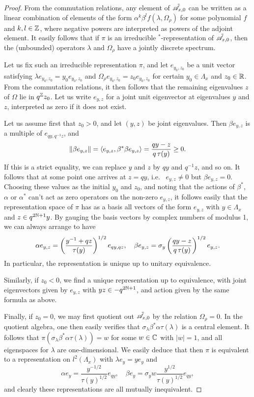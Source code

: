 \begin{proof} From the commutation relations, any element of $\tilde{\mathscr{A}}_{x,0}$ can be written as a linear combination of elements of the form $\alpha^k \beta^l f(\lambda,\Omega_{\rho})$ for some polynomial $f$ and $k,l\in \mathbb{Z}$, where negative powers are interpreted as powers of the adjoint element. It easily follows that if $\pi$ is an irreducible $^*$-representation of $\tilde{\mathscr{A}}_{x,0}$, then the (unbounded) operators $\lambda$ and $\Omega_{\rho}$ have a jointly discrete spectrum. 

Let us fix such an irreducible representation $\pi$, and let $e_{y_0,z_0}$ be a unit vector satisfying $\lambda e_{y_0,z_0} = y_0e_{y_0,z_0}$ and $\Omega_{\rho} e_{y_0,z_0} = z_0 e_{y_0,z_0}$ for certain $y_0 \in \Lambda_x$ and $z_0\in \mathbb{R}$. From the commutation relations, it then follows that the remaining eigenvalues $z$ of $\Omega$ lie in $q^{\mathbb{Z}}z_0$. Let us write $e_{y,z}$ for a joint unit eigenvector at eigenvalues $y$ and $z$, interpreted as zero if it does not exist. 

Let us assume first that $z_0>0$, and let $(y,z)$ be joint eigenvalues. Then $\beta e_{y,z}$ is a multiple of $e_{qy,q^{-1}z}$, and \[\|\beta e_{y,z}\| = \langle e_{y,z},\beta^* \beta e_{y,z}\rangle = \frac{qy-z}{q\operatorname{\tau}(y)} \geq 0.\]  If this is a strict equality, we can replace $y$ and $z$ by $qy$ and $q^{-1}z$, and so on. It follows that at some point one arrives at $z=qy$, i.e.~ $e_{y,z}\neq 0$ but $\beta e_{y,z}=0$. Choosing these values as the initial $y_0$ and $z_0$, and noting that the actions of $\beta^*$, $\alpha$ or $\alpha^*$ can't act as zero operators on the non-zero $e_{y,z}$, it follows easily that the representation space of $\pi$ has as a basis all vectors of the form $e_{y,z}$ with $y\in \Lambda_x$ and $z\in q^{2\mathbb{N}+1}y$. By gauging the basis vectors by complex numbers of modulus 1, we can always arrange to have \[\alpha e_{y,z} =  \left(\frac{y^{-1}+qz}{\operatorname{\tau}(y)}\right)^{1/2}e_{qy,qz}, \quad \beta e_{y,z} = \sigma_y \left(\frac{qy-z}{q\operatorname{\tau}(y)}\right)^{1/2}e_{y,z}.\] In particular, the representation is unique up to unitary equivalence.

Similarly, if $z_0<0$, we find a unique representation up to equivalence, with joint eigenvectors given by $e_{y,z}$ with $yz \in -q^{2\mathbb{N}+1}$, and action given by the same formula as above.

Finally, if $z_0=0$, we may first quotient out $\tilde{\mathscr{A}}_{x,0}$ by the relation $\Omega_{\rho}=0$. In the quotient algebra, one then easily verifies that $\sigma_{\lambda}\beta^*\alpha\tau(\lambda)$ is a central element. It follows that $\pi(\sigma_{\lambda}\beta^*\alpha\tau(\lambda)) = w$ for some $w \in \mathbb{C}$ with $|w|=1$, and all eigenspaces for $\lambda$ are one-dimensional. We easily deduce that then $\pi$ is equivalent to a representation on $l^2(\Lambda_x)$ with $\lambda e_y = ye_y$ and  
\[\alpha e_y = \frac{y^{-1/2}}{\tau(y)^{1/2}}e_{qy},\quad \beta e_y = \sigma_y w \frac{y^{1/2}}{\tau(y)^{1/2}}e_{qy},\] and clearly these representations are all mutually inequivalent. 
\end{proof} 

